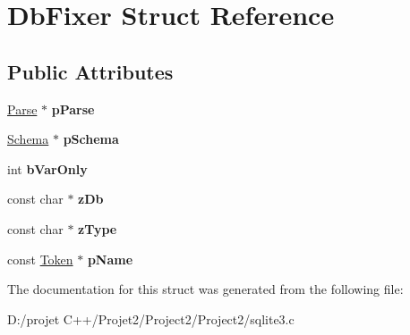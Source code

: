 \hypertarget{struct_db_fixer}{}\section{Db\+Fixer Struct Reference}
\label{struct_db_fixer}
\subsection*{Public Attributes}
\begin{DoxyCompactItemize}
\item 
\mbox{\label{struct_db_fixer_ac5c9b8bca3b05a66faea11dd998bf6f6}} 
\mbox{\hyperlink{struct_parse}{Parse}} $\ast$ {\bfseries p\+Parse}
\item 
\mbox{\label{struct_db_fixer_a302dd5335c8a982deda5bf04bae00363}} 
\mbox{\hyperlink{struct_schema}{Schema}} $\ast$ {\bfseries p\+Schema}
\item 
\mbox{\label{struct_db_fixer_aebd8549176b84c8c71069ed4d77ad6af}} 
int {\bfseries b\+Var\+Only}
\item 
\mbox{\label{struct_db_fixer_aba91df5965a99915d9180805d02c4a7f}} 
const char $\ast$ {\bfseries z\+Db}
\item 
\mbox{\label{struct_db_fixer_ae4748d9e97560b7b332527434408c2e8}} 
const char $\ast$ {\bfseries z\+Type}
\item 
\mbox{\label{struct_db_fixer_aedee20e10de7337651b84656ee81b39c}} 
const \mbox{\hyperlink{struct_token}{Token}} $\ast$ {\bfseries p\+Name}
\end{DoxyCompactItemize}


The documentation for this struct was generated from the following file\+:\begin{DoxyCompactItemize}
\item 
D\+:/projet C++/\+Projet2/\+Project2/\+Project2/sqlite3.\+c\end{DoxyCompactItemize}
